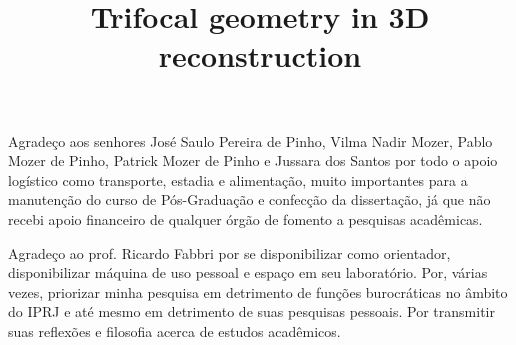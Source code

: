 \documentclass[a4paper,12pt,oneside,onecolumn,final,fleqn]{repUERJ}
\title{Trifocal geometry in 3D reconstruction}
\begin{document}
\frontmatter
\capa
\folhaderosto
%
\begin{folhadeaprovacao}
\end{folhadeaprovacao}
Agradeço aos senhores José Saulo Pereira de Pinho, Vilma Nadir Mozer, Pablo Mozer de Pinho, Patrick Mozer de Pinho e Jussara dos Santos por todo o apoio logístico como transporte, estadia e alimentação, muito importantes para a manutenção do curso de Pós-Graduação e confecção da dissertação, já que não recebi apoio financeiro de qualquer órgão de fomento a pesquisas acadêmicas.

Agradeço ao prof. Ricardo Fabbri por se disponibilizar como orientador, disponibilizar máquina de uso pessoal e espaço em seu laboratório. Por, várias vezes, priorizar minha pesquisa em detrimento de funções burocráticas no âmbito do IPRJ e até mesmo em detrimento de suas pesquisas pessoais. Por transmitir suas reflexões e filosofia acerca de estudos acadêmicos. 
\end{document}
